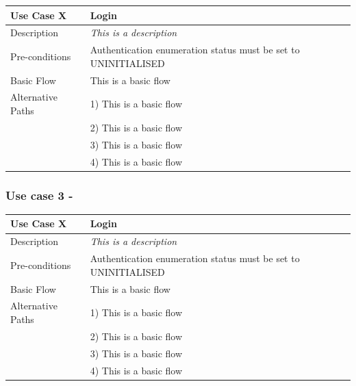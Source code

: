 \documentclass[12pt]{article}
\begin{document}
\begin{subappendices}
	\begin{table}[H]
		\begin{tabular}{ll}
			\hline
			\rowcolor[HTML]{EFEFEF} 
			\textbf{Use Case X}  & \textbf{Login}                                                 \\ \hline
			\rowcolor[HTML]{F5FBFF} 
			Description 		 & \textit{This is a description}                                 \\ \hline
			\rowcolor[HTML]{EFEFEF} 
			Pre-conditions       & Authentication enumeration status must be set to UNINITIALISED \\ \hline
			\rowcolor[HTML]{F5FBFF} 
			Basic Flow           & This is a basic flow                                           \\ \hline
			\rowcolor[HTML]{EFEFEF} 
			Alternative Paths    & 1) This is a basic flow                                        \\
			\rowcolor[HTML]{EFEFEF} 
			& 2) This is a basic flow                                        \\
			\rowcolor[HTML]{EFEFEF} 
			& 3) This is a basic flow                                        \\
			\rowcolor[HTML]{EFEFEF} 
			& 4) This is a basic flow                                       
		\end{tabular}
	\end{table}

	\subsubsection{Use case 3 - }
	
	\begin{table}[H]
		\begin{tabular}{ll}
			\hline
			\rowcolor[HTML]{EFEFEF} 
			\textbf{Use Case X}  & \textbf{Login}                                                 \\ \hline
			\rowcolor[HTML]{F5FBFF} 
			Description 		 & \textit{This is a description}                                 \\ \hline
			\rowcolor[HTML]{EFEFEF} 
			Pre-conditions       & Authentication enumeration status must be set to UNINITIALISED \\ \hline
			\rowcolor[HTML]{F5FBFF} 
			Basic Flow           & This is a basic flow                                           \\ \hline
			\rowcolor[HTML]{EFEFEF} 
			Alternative Paths    & 1) This is a basic flow                                        \\
			\rowcolor[HTML]{EFEFEF} 
			& 2) This is a basic flow                                        \\
			\rowcolor[HTML]{EFEFEF} 
			& 3) This is a basic flow                                        \\
			\rowcolor[HTML]{EFEFEF} 
			& 4) This is a basic flow                                       
		\end{tabular}
	\end{table}


\end{subappendices}
\end{document}
